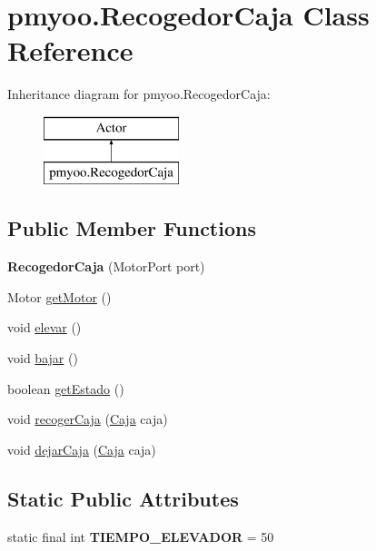 \hypertarget{classpmyoo_1_1_recogedor_caja}{}\section{pmyoo.\+Recogedor\+Caja Class Reference}
\label{classpmyoo_1_1_recogedor_caja}
Inheritance diagram for pmyoo.\+Recogedor\+Caja\+:\begin{figure}[H]
\begin{center}
\leavevmode
\includegraphics[height=2.000000cm]{classpmyoo_1_1_recogedor_caja}
\end{center}
\end{figure}
\subsection*{Public Member Functions}
\begin{DoxyCompactItemize}
\item 
\mbox{\label{classpmyoo_1_1_recogedor_caja_a7f8edfb198ca7f227c9ae4f4df46709e}} 
{\bfseries Recogedor\+Caja} (Motor\+Port port)
\item 
Motor \mbox{\hyperlink{classpmyoo_1_1_recogedor_caja_a3e34ca212881d63d8d9eb5657dcc2089}{get\+Motor}} ()
\item 
void \mbox{\hyperlink{classpmyoo_1_1_recogedor_caja_a94c5cdce71ce343490aa39101e551717}{elevar}} ()
\item 
void \mbox{\hyperlink{classpmyoo_1_1_recogedor_caja_ae7bc7adbd886765db7c73c4c5a1223e8}{bajar}} ()
\item 
boolean \mbox{\hyperlink{classpmyoo_1_1_recogedor_caja_a6c8a3ab0cdcfe6037f82de19791dfa39}{get\+Estado}} ()
\item 
void \mbox{\hyperlink{classpmyoo_1_1_recogedor_caja_af00b81c904386ff1758a3afde032baec}{recoger\+Caja}} (\mbox{\hyperlink{classpmyoo_1_1_caja}{Caja}} caja)
\item 
void \mbox{\hyperlink{classpmyoo_1_1_recogedor_caja_abe6a643d0dfe800a62ca5887454adf5a}{dejar\+Caja}} (\mbox{\hyperlink{classpmyoo_1_1_caja}{Caja}} caja)
\end{DoxyCompactItemize}
\subsection*{Static Public Attributes}
\begin{DoxyCompactItemize}
\item 
\mbox{\label{classpmyoo_1_1_recogedor_caja_ace4e961ab7cae9450ab4213445f4543b}} 
static final int {\bfseries T\+I\+E\+M\+P\+O\+\_\+\+E\+L\+E\+V\+A\+D\+OR} = 50
\end{DoxyCompactItemize}


